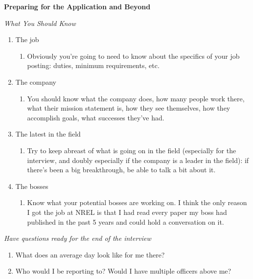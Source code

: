 \documentclass[12pt]{article}
\begin{document}
\begin{spacing}{1.5}
\begin{enumerate}
\begin{enumerate}
 		\end{enumerate}
   {\LARGE \item \textbf{Preparing for the Application and Beyond}}
    		 	\begin{enumerate}
    		 	{\large \item \emph{What You Should Know}}
     				\begin{enumerate}
        				 \item The job
        				 \begin{enumerate}
         					\item[] Obviously you're going to need to know about the specifics of your job posting: duties, minimum requirements, etc.
         					\end{enumerate}
        				 \item The company
        				 \begin{enumerate}
         					\item[] You should know what the company does, how many people work there, what their mission statement is, how they see themselves, how they accomplish goals, what successes they've had.
         					\end{enumerate}
        				 \item The latest in the field
        				 \begin{enumerate}
         					\item[] Try to keep abreast of what is going on in the field (especially for the interview, and doubly especially if the company is a leader in the field): if there's been a big breakthrough, be able to talk a bit about it.
         					\end{enumerate}
        				 \item The bosses
        				 \begin{enumerate}
         					\item[] Know what your potential bosses are working on. I think the only reason I got the job at NREL is that I had read every paper my boss had published in the past 5 years and could hold a conversation on it.
         					\end{enumerate}
       			\end{enumerate}
    			 {\large \item \emph{Have questions ready for the end of the interview}}
    				\begin{enumerate}
        				 \item What does an average day look like for me there?
        				 \item Who would I be reporting to? Would I have multiple officers above me?

\end{enumerate}
\end{enumerate}
\end{enumerate}
\end{spacing}
\end{document}
